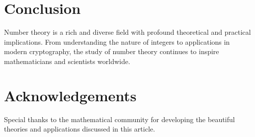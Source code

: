\documentclass[12pt]{article}
\begin{document}
\section{Conclusion}
Number theory is a rich and diverse field with profound theoretical and practical implications. From understanding the nature of integers to applications in modern cryptography, the study of number theory continues to inspire mathematicians and scientists worldwide.

\section*{Acknowledgements}
Special thanks to the mathematical community for developing the beautiful theories and applications discussed in this article.
\end{document}
